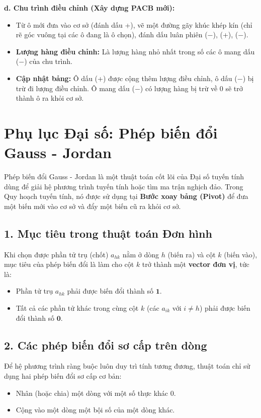 \textbf{d. Chu trình điều chỉnh (Xây dựng PACB mới):}
\begin{itemize}
    \item Từ ô mới đưa vào cơ sở (đánh dấu +), vẽ một đường gãy khúc khép kín (chỉ rẽ góc vuông tại các ô đang là ô chọn), đánh dấu luân phiên ($-$), (+), ($-$).
    \item \textbf{Lượng hàng điều chỉnh:} Là lượng hàng nhỏ nhất trong số các ô mang dấu ($-$) của chu trình.
    \item \textbf{Cập nhật bảng:} Ô dấu (+) được cộng thêm lượng điều chỉnh, ô dấu ($-$) bị trừ đi lượng điều chỉnh. Ô mang dấu ($-$) có lượng hàng bị trừ về 0 sẽ trở thành ô ra khỏi cơ sở.
\end{itemize}

\vspace{1cm}
\section{Phụ lục Đại số: Phép biến đổi Gauss - Jordan}
\label{app:gauss_jordan}

Phép biến đổi Gauss - Jordan là một thuật toán cốt lõi của Đại số tuyến tính dùng để giải hệ phương trình tuyến tính hoặc tìm ma trận nghịch đảo. Trong Quy hoạch tuyến tính, nó được sử dụng tại \textbf{Bước xoay bảng (Pivot)} để đưa một biến mới vào cơ sở và đẩy một biến cũ ra khỏi cơ sở.

\subsection*{1. Mục tiêu trong thuật toán Đơn hình}
Khi chọn được phần tử trụ (chốt) $a_{hk}$ nằm ở dòng $h$ (biến ra) và cột $k$ (biến vào), mục tiêu của phép biến đổi là làm cho cột $k$ trở thành một \textbf{vector đơn vị}, tức là:
\begin{itemize}
    \item Phần tử trụ $a_{hk}$ phải được biến đổi thành số $\mathbf{1}$.
    \item Tất cả các phần tử khác trong cùng cột $k$ (các $a_{ik}$ với $i \neq h$) phải được biến đổi thành số $\mathbf{0}$.
\end{itemize}

\subsection*{2. Các phép biến đổi sơ cấp trên dòng}
Để hệ phương trình ràng buộc luôn duy trì tính tương đương, thuật toán chỉ sử dụng hai phép biến đổi sơ cấp cơ bản:
\begin{itemize}
    \item Nhân (hoặc chia) một dòng với một số thực khác $0$.
    \item Cộng vào một dòng một bội số của một dòng khác.
\end{itemize}

